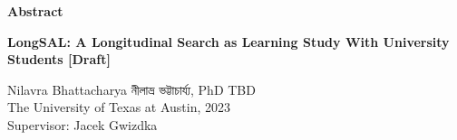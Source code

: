 \documentclass[letterpaper, nobind]{templates/ociamthesis}
\begin{document}
\begin{romanpages}



\begin{center}
  \textbf{Abstract}\\
  
  \vspace{18pt}
  
  \begin{spacing}{2}
    {\Large{\textbf{LongSAL: A Longitudinal Search as Learning Study With University Students {[}Draft{]}}}}
  \end{spacing}

  \vspace{18pt}

  \begin{spacing}{1.4}
    Nilavra Bhattacharya নীলাভ্র ভট্টাচার্য্য, PhD TBD\\
    The University of Texas at Austin, 2023\\
    \vspace{24pt}
    Supervisor: Jacek Gwizdka
  \end{spacing}


\end{center}
\end{romanpages}
\end{document}
